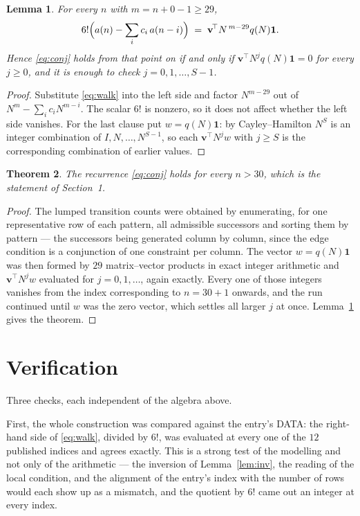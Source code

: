 \documentclass[11pt,a4paper]{article}
\theoremstyle{plain}
\newtheorem{theorem}{Theorem}
\newtheorem{lemma}[theorem]{Lemma}
\theoremstyle{definition}
\begin{document}
\begin{lemma}\label{lem:crit}
For every $n$ with $m=n+0-1\ge29$,
\[
6!\Bigl(a(n)-\sum_i c_i\,a(n-i)\Bigr)\;=\;\mathbf{v}^{\!\top}N^{\,m-29}q(N)\mathbf{1} .
\]
Hence \eqref{eq:conj} holds from that point on if and only if
$\mathbf{v}^{\!\top}N^{j}q(N)\mathbf{1}=0$ for every $j\ge0$, and it is enough to check
$j=0,1,\dots,S-1$.
\end{lemma}

\begin{proof}
Substitute \eqref{eq:walk} into the left side and factor $N^{m-29}$ out of
$N^{m}-\sum_i c_iN^{m-i}$. The scalar $6!$ is nonzero, so it does not affect whether
the left side vanishes. For the last clause put $w=q(N)\mathbf{1}$: by Cayley--Hamilton
$N^{S}$ is an integer combination of $I,N,\dots,N^{S-1}$, so each
$\mathbf{v}^{\!\top}N^{j}w$ with $j\ge S$ is the corresponding combination of earlier
values.
\end{proof}

\begin{theorem}
The recurrence \eqref{eq:conj} holds for every $n>30$, which is the statement of
Section~1.
\end{theorem}

\begin{proof}
The lumped transition counts were obtained by enumerating, for one representative row of
each pattern, all admissible successors and sorting them by pattern --- the successors being
generated column by column, since the edge condition is a conjunction of one constraint per
column. The vector $w=q(N)\mathbf{1}$ was then formed by $29$ matrix--vector products
in exact integer arithmetic and $\mathbf{v}^{\!\top}N^{j}w$ evaluated for
$j=0,1,\dots$, again exactly. Every one of those integers vanishes from the index
corresponding to $n=30+1$ onwards, and the run continued until $w$ was the zero vector,
which settles all larger $j$ at once. Lemma~\ref{lem:crit} gives the theorem.
\end{proof}

\section{Verification}

Three checks, each independent of the algebra above.

First, the whole construction was compared against the entry's DATA: the right-hand side of
\eqref{eq:walk}, divided by $6!$, was evaluated at every one of the $12$
published indices and agrees exactly. This is a strong test of the modelling and not only of
the arithmetic --- the inversion of Lemma~\ref{lem:inv}, the reading of the local
condition, and the alignment of the entry's index with the number of rows would each
show up as a mismatch, and the quotient by $6!$ came out an integer at every index.
\end{document}
